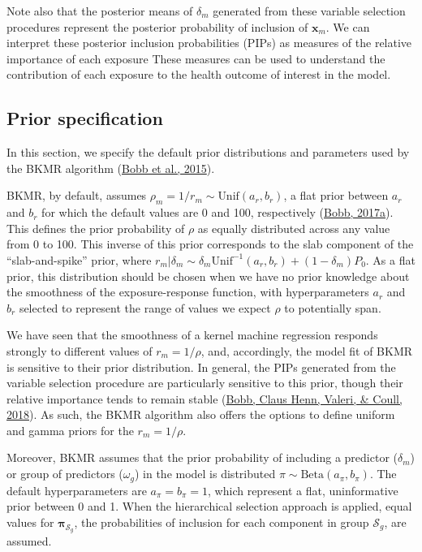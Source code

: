 \documentclass[12pt, twoside]{amherstthesis}
\begin{document}
Note also that the posterior means of \(\delta_m\) generated from these variable selection procedures represent the posterior probability of inclusion of \(\textbf{x}_m\). We can interpret these posterior inclusion probabilities (PIPs) as measures of the relative importance of each exposure These measures can be used to understand the contribution of each exposure to the health outcome of interest in the model.

\hypertarget{bkmrprior}{%
\subsection{Prior specification}\label{bkmrprior}}

In this section, we specify the default prior distributions and parameters used by the BKMR algorithm (\protect\hyperlink{ref-bobb_bayesian_2015}{Bobb et al., 2015}).

BKMR, by default, assumes \(\rho_m=1/r_m \sim \text{Unif}(a_r,b_r)\), a flat prior between \(a_r\) and \(b_r\) for which the default values are 0 and 100, respectively (\protect\hyperlink{ref-bobb_introduction_2017}{Bobb, 2017a}). This defines the prior probability of \(\rho\) as equally distributed across any value from 0 to 100. This inverse of this prior corresponds to the slab component of the ``slab-and-spike'' prior, where \(r_m|\delta_m \sim \delta_m\text{Unif}^{-1}(a_r, b_r) + (1-\delta_m)P_0\). As a flat prior, this distribution should be chosen when we have no prior knowledge about the smoothness of the exposure-response function, with hyperparameters \(a_r\) and \(b_r\) selected to represent the range of values we expect \(\rho\) to potentially span.

We have seen that the smoothness of a kernel machine regression responds strongly to different values of \(r_m=1/\rho\), and, accordingly, the model fit of BKMR is sensitive to their prior distribution. In general, the PIPs generated from the variable selection procedure are particularly sensitive to this prior, though their relative importance tends to remain stable (\protect\hyperlink{ref-bobb_statistical_2018}{Bobb, Claus Henn, Valeri, \& Coull, 2018}). As such, the BKMR algorithm also offers the options to define uniform and gamma priors for the \(r_m=1/\rho\).

Moreover, BKMR assumes that the prior probability of including a predictor (\(\delta_m\)) or group of predictors (\(\omega_g\)) in the model is distributed \(\pi \sim \text{Beta}(a_\pi, b_\pi)\). The default hyperparameters are \(a_\pi=b_\pi=1\), which represent a flat, uninformative prior between 0 and 1. When the hierarchical selection approach is applied, equal values for \(\boldsymbol\pi_{\mathcal{S}_g}\), the probabilities of inclusion for each component in group \(\mathcal{S}_g\), are assumed.
\end{document}

